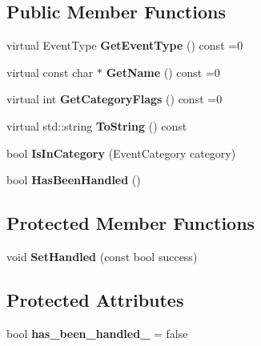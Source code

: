 \subsection*{Public Member Functions}
\begin{DoxyCompactItemize}
\item
\mbox{\label{classengine_1_1events_1_1Event_a99604df0759386f2cea0071efa52d6e9}}
virtual Event\+Type {\bfseries Get\+Event\+Type} () const =0
\item
\mbox{\label{classengine_1_1events_1_1Event_a11bf339abb972f3c06f1cf20a0ff894b}}
virtual const char $\ast$ {\bfseries Get\+Name} () const =0
\item
\mbox{\label{classengine_1_1events_1_1Event_a24e56efda02b259ac08ecc5ade26963d}}
virtual int {\bfseries Get\+Category\+Flags} () const =0
\item
\mbox{\label{classengine_1_1events_1_1Event_afad3baa55387283c7cfe692292edc269}}
virtual std\+::string {\bfseries To\+String} () const
\item
\mbox{\label{classengine_1_1events_1_1Event_a1f55831a2eb7d5a22125e347fb6673a3}}
bool {\bfseries Is\+In\+Category} (Event\+Category category)
\item
\mbox{\label{classengine_1_1events_1_1Event_a39202ff693f2701f2f736dfd0b4f3878}}
bool {\bfseries Has\+Been\+Handled} ()
\end{DoxyCompactItemize}
\subsection*{Protected Member Functions}
\begin{DoxyCompactItemize}
\item
\mbox{\label{classengine_1_1events_1_1Event_aa85c36143880a3312b1c63166463ef5d}}
void {\bfseries Set\+Handled} (const bool success)
\end{DoxyCompactItemize}
\subsection*{Protected Attributes}
\begin{DoxyCompactItemize}
\item
\mbox{\label{classengine_1_1events_1_1Event_ad8e1eb6634225e11963228d6a69c166b}}
bool {\bfseries has\+\_\+been\+\_\+handled\+\_\+} = false
\end{DoxyCompactItemize}
